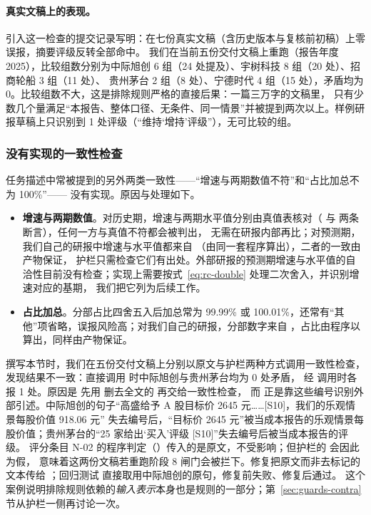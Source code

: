 \paragraph{真实文稿上的表现。}引入这一检查的提交记录写明：在七份真实文稿（含历史版本与复核前初稿）上零误报，摘要评级反转全部命中。
我们在当前五份交付文稿上重跑（报告年度 2025），比较组数分别为中际旭创 6 组（24 处提及）、宇树科技 8 组（20 处）、招商轮船 3 组（11 处）、
贵州茅台 2 组（8 处）、宁德时代 4 组（15 处），矛盾均为 0。比较组数不大，这是排除规则严格的直接后果：一篇三万字的文稿里，
只有少数几个量满足“本报告、整体口径、无条件、同一情景”并被提到两次以上。样例研报草稿上只识别到 1 处评级（“维持‘增持’评级”），无可比较的组。

\subsubsection{没有实现的一致性检查}

任务描述中常被提到的另外两类一致性——“增速与两期数值不符”和“占比加总不为 100\%”—— 没有实现。原因与处理如下。
\begin{itemize}
\item \textbf{增速与两期数值}。对历史期，增速与两期水平值分别由真值表核对（ 与  两条断言），任何一方与真值不符都会被判出，
  无需在研报内部再比；对预测期，我们自己的研报中增速与水平值都来自 （由同一套程序算出），二者的一致由产物保证，
  护栏只需检查它们有出处。外部研报的预测期增速与水平值的自洽性目前没有检查；实现上需要按式~\eqref{eq:rc-double} 处理二次舍入，并识别增速对应的基期，
  我们把它列为后续工作。
\item \textbf{占比加总}。分部占比四舍五入后加总常为 99.99\% 或 100.01\%，还常有“其他”项省略，误报风险高；对我们自己的研报，分部数字来自
  ，占比由程序以  算出，同样由产物保证。
\end{itemize}

\begin{failcase}
撰写本节时，我们在五份交付文稿上分别以原文与护栏两种方式调用一致性检查，发现结果不一致：直接调用  时中际旭创与贵州茅台均为 0 处矛盾，
经  调用时各报 1 处。原因是  先用  删去全文的 \code{[S编号]} 再交给一致性检查，
而  正是靠这些编号识别外部引述。中际旭创的句子“高盛给予 A 股目标价 2645 元……[S10]，我们的乐观情景每股价值 918.06 元”
失去编号后，“目标价 2645 元”被当成本报告的乐观情景每股价值；贵州茅台的“25 家给出‘买入’评级 [S10]”失去编号后被当成本报告的评级。
评分条目 N-02 的程序判定（）传入的是原文，不受影响；但护栏的  会因此为假，
意味着这两份文稿若重跑阶段 8 闸门会被拦下。修复把原文而非去标记的文本传给 ；回归测试  直接取用中际旭创的原句，修复前失败、修复后通过。
这个案例说明排除规则依赖的\emph{输入表示}本身也是规则的一部分；第~\ref{sec:guards-contra} 节从护栏一侧再讨论一次。
\end{failcase}

